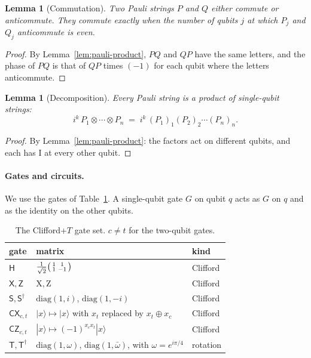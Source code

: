 \documentclass[11pt]{article}
\newtheorem{lemma}[theorem]{Lemma}
\theoremstyle{definition}
\theoremstyle{remark}
\newcommand{\adj}{^{\dagger}}
\newcommand{\tI}{\mathrm{I}}
\newcommand{\tX}{\mathrm{X}}
\newcommand{\tZ}{\mathrm{Z}}
\newcommand{\gate}[1]{\mathsf{#1}}
\begin{document}
\begin{lemma}[Commutation]\label{lem:commute}
Two Pauli strings $P$ and $Q$ either commute or anticommute. They commute exactly when the
number of qubits $j$ at which $P_j$ and $Q_j$ anticommute is even.
\end{lemma}

\begin{proof}
By Lemma~\ref{lem:pauli-product}, $PQ$ and $QP$ have the same letters, and the phase of
$PQ$ is that of $QP$ times $(-1)$ for each qubit where the letters anticommute.
\end{proof}

\begin{lemma}[Decomposition]\label{lem:decomp}
Every Pauli string is a product of single-qubit strings:
\[
  i^k \, P_1 \otimes \cdots \otimes P_n \;=\; i^k \, (P_1)_1 (P_2)_2 \cdots (P_n)_n .
\]
\end{lemma}

\begin{proof}
By Lemma~\ref{lem:pauli-product}: the factors act on different qubits, and each has $\tI$
at every other qubit.
\end{proof}

\paragraph{Gates and circuits.}
We use the gates of Table~\ref{tab:gates}. A single-qubit gate $G$ on qubit $q$ acts as $G$
on $q$ and as the identity on the other qubits.

\begin{table}[h]
\centering
\renewcommand{\arraystretch}{1.3}
\begin{tabular}{lll}
\toprule
gate & matrix & kind \\
\midrule
$\gate{H}$ & $\tfrac{1}{\sqrt2}\begin{psmallmatrix}1&1\\1&-1\end{psmallmatrix}$ & Clifford \\
$\gate{X}, \gate{Z}$ & $\tX, \tZ$ & Clifford \\
$\gate{S}, \gate{S}\adj$ & $\mathrm{diag}(1, i)$, $\mathrm{diag}(1, -i)$ & Clifford \\
$\gate{CX}_{c,t}$ & $|x\rangle \mapsto |x\rangle$ with $x_t$ replaced by $x_t \oplus x_c$ & Clifford \\
$\gate{CZ}_{c,t}$ & $|x\rangle \mapsto (-1)^{x_c x_t}|x\rangle$ & Clifford \\
$\gate{T}, \gate{T}\adj$ & $\mathrm{diag}(1, \omega)$, $\mathrm{diag}(1, \bar\omega)$, with $\omega = e^{i\pi/4}$ & rotation \\
\bottomrule
\end{tabular}
\caption{The Clifford+$T$ gate set. $c \neq t$ for the two-qubit gates.}
\label{tab:gates}
\end{table}
\end{document}
